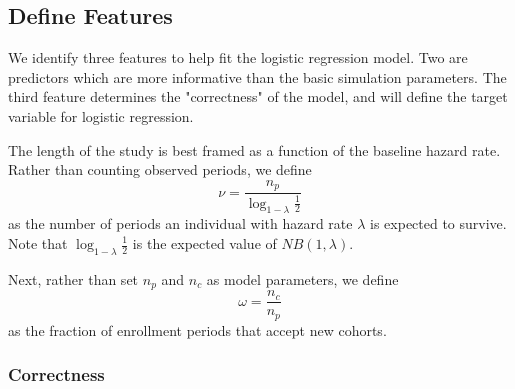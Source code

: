 \subsection{Define Features}

We identify three features to help fit the logistic regression model. Two are predictors which are more informative than the basic simulation parameters. The third feature determines the "correctness" of the model, and will define the target variable for logistic regression.

The length of the study is best framed as a function of the baseline hazard rate. Rather than counting observed periods, we define
%
\begin{equation}
\label{eq:nu}
    \nu = \frac{n_p}{\log_{1-\lambda}\frac{1}{2}}  
\end{equation}
%
as the number of periods an individual with hazard rate $\lambda$ is expected to survive. Note that $\log_{1-\lambda}\frac{1}{2}$ is the expected value of $NB(1, \lambda)$. 

Next, rather than set $n_p$ and $n_c$ as model parameters, we define
%
\begin{equation}
\label{eq:omega}
    \omega = \frac{n_c}{n_p}    
\end{equation}
%
as the fraction of enrollment periods that accept new cohorts.

\subsubsection{Correctness}

